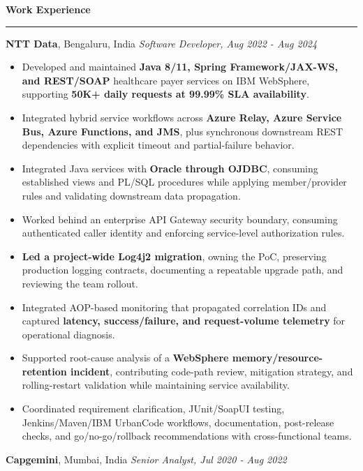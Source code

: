 \documentclass[11pt,letterpaper]{article}
\newcommand{\ressection}[1]{\Needspace{6\baselineskip}\vspace{8pt}\par\textbf{#1}\par\vspace{2pt}\hrule\vspace{5pt}}
\begin{document}
\ressection{Work Experience}
\textbf{NTT Data}, Bengaluru, India \hfill \textit{Software Developer, Aug 2022 - Aug 2024}
\begin{itemize}
  \item Developed and maintained \textbf{Java 8/11, Spring Framework/JAX-WS, and REST/SOAP} healthcare payer services on IBM WebSphere, supporting \textbf{50K+ daily requests at 99.99\% SLA availability}.
  \item Integrated hybrid service workflows across \textbf{Azure Relay, Azure Service Bus, Azure Functions, and JMS}, plus synchronous downstream REST dependencies with explicit timeout and partial-failure behavior.
  \item Integrated Java services with \textbf{Oracle through OJDBC}, consuming established views and PL/SQL procedures while applying member/provider rules and validating downstream data propagation.
  \item Worked behind an enterprise API Gateway security boundary, consuming authenticated caller identity and enforcing service-level authorization rules.
  \item \textbf{Led a project-wide Log4j2 migration}, owning the PoC, preserving production logging contracts, documenting a repeatable upgrade path, and reviewing the team rollout.
  \item Integrated AOP-based monitoring that propagated correlation IDs and captured \textbf{latency, success/failure, and request-volume telemetry} for operational diagnosis.
  \item Supported root-cause analysis of a \textbf{WebSphere memory/resource-retention incident}, contributing code-path review, mitigation strategy, and rolling-restart validation while maintaining service availability.
  \item Coordinated requirement clarification, JUnit/SoapUI testing, Jenkins/Maven/IBM UrbanCode workflows, documentation, post-release checks, and go/no-go/rollback recommendations with cross-functional teams.
\end{itemize}
\textbf{Capgemini}, Mumbai, India \hfill \textit{Senior Analyst, Jul 2020 - Aug 2022}
\end{document}
